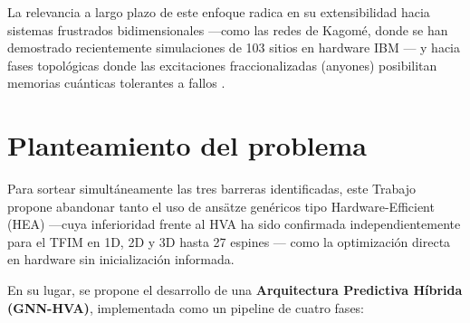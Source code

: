 \documentclass[11pt,a4paper,spanish]{book}
\begin{document}
La relevancia a largo plazo de este enfoque radica en su extensibilidad hacia sistemas frustrados bidimensionales ---como las redes de Kagomé, donde se han demostrado recientemente simulaciones de 103 sitios en hardware IBM \citep{ahsan2025}--- y hacia fases topológicas donde las excitaciones fraccionalizadas (anyones) posibilitan memorias cuánticas tolerantes a fallos \citep{savary2016}.

\section{Planteamiento del problema}

Para sortear simultáneamente las tres barreras identificadas, este Trabajo propone abandonar tanto el uso de ansätze genéricos tipo Hardware-Efficient (HEA) ---cuya inferioridad frente al HVA ha sido confirmada independientemente para el TFIM en 1D, 2D y 3D hasta 27 espines \citep{tripathi2026}--- como la optimización directa en hardware sin inicialización informada.

En su lugar, se propone el desarrollo de una \textbf{Arquitectura Predictiva Híbrida (GNN-HVA)}, implementada como un pipeline de cuatro fases:
\end{document}
